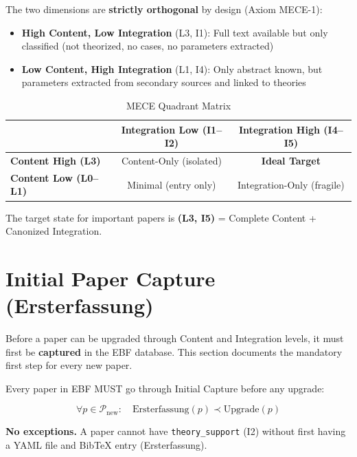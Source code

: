 The two dimensions are \textbf{strictly orthogonal} by design (Axiom MECE-1):

\begin{itemize}
    \item \textbf{High Content, Low Integration} (L3, I1): Full text available but only classified (not theorized, no cases, no parameters extracted)
    \item \textbf{Low Content, High Integration} (L1, I4): Only abstract known, but parameters extracted from secondary sources and linked to theories
\end{itemize}

\begin{table}[htbp]
\centering
\caption{MECE Quadrant Matrix}
\label{tab:mece-quadrants}
\renewcommand{\arraystretch}{1.3}
\begin{tabular}{@{}l|cc@{}}
\toprule
 & \textbf{Integration Low (I1--I2)} & \textbf{Integration High (I4--I5)} \\
\midrule
\textbf{Content High (L3)} & Content-Only (isolated) & \textbf{Ideal Target} \\
\textbf{Content Low (L0--L1)} & Minimal (entry only) & Integration-Only (fragile) \\
\bottomrule
\end{tabular}
\end{table}

The target state for important papers is \textbf{(L3, I5)} = Complete Content + Canonized Integration.


\section{Initial Paper Capture (Ersterfassung)}
\label{sec:paperint-ersterfassung}

Before a paper can be upgraded through Content and Integration levels, it must first
be \textbf{captured} in the EBF database. This section documents the mandatory first
step for every new paper.

\begin{tcolorbox}[colback=green!5!white, colframe=green!75!black,
    title=\textbf{Axiom ERST-1: Mandatory Initial Capture}]

Every paper in EBF MUST go through Initial Capture before any upgrade:

\begin{equation}
\forall p \in \mathcal{P}_{\text{new}}: \quad \text{Ersterfassung}(p) \prec \text{Upgrade}(p)
\end{equation}

\textbf{No exceptions.} A paper cannot have \texttt{theory\_support} (I2) without first
having a YAML file and BibTeX entry (Ersterfassung).

\end{tcolorbox}

